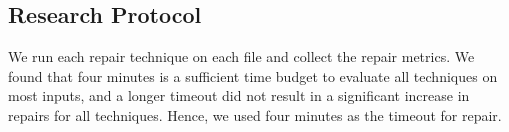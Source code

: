 \documentclass[sigconf,review,anonymous]{acmart}
\newcommand{\formatfree}{format-free\xspace}
\newcommand{\formatdependent}{format-dependent\xspace}
\newcommand{\dtask}{data repair\xspace}
\newcommand{\approach}{\textsc{$\Delta$Repair}\xspace}
\newcommand{\ddmax}{\textit{DDMax}\xspace}
\newcommand{\drepair}{\approach}
\begin{document}
\subsection{Research Protocol}
We run each repair technique on each file and collect the repair metrics.
We found that four minutes is a sufficient time budget to evaluate all
techniques on most inputs, and a longer timeout did not result in a
significant increase in repairs for all techniques. Hence, we used four
minutes as the timeout for repair.


% 
% 
% 
\end{document}
